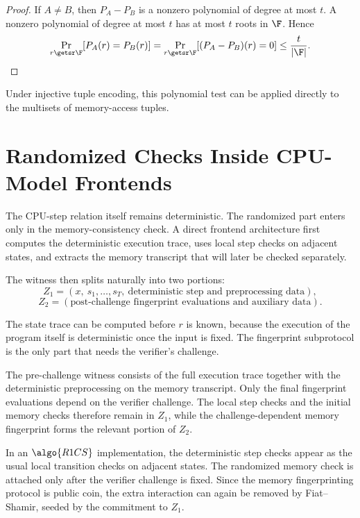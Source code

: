 \documentclass[11pt]{article}
\begin{document}
\begin{proof}
If $A \neq B$, then $P_A - P_B$ is a nonzero polynomial of degree at most $t$.
A nonzero polynomial of degree at most $t$ has at most $t$ roots in $\F$.
Hence
\[
  \Pr_{r \getsr \F}[P_A(r)=P_B(r)]
  =
  \Pr_{r \getsr \F}[(P_A-P_B)(r)=0]
  \le \frac{t}{|\F|}.
\]
\end{proof}

Under injective tuple encoding, this polynomial test can be applied directly to
the multisets of memory-access tuples.

\section{Randomized Checks Inside CPU-Model Frontends}

The CPU-step relation itself remains deterministic.  The randomized part enters
only in the memory-consistency check.  A direct frontend architecture first
computes the deterministic execution trace, uses local step checks on adjacent
states, and extracts the memory transcript that will later be checked
separately.

The witness then splits naturally into two portions:
\[
  Z_1 = (x,\ s_1,\ldots,s_T,\ \text{deterministic step and preprocessing data}),
\]
\[
  Z_2 = (\text{post-challenge fingerprint evaluations and auxiliary data}).
\]

The state trace can be computed before $r$ is known, because the execution of
the program itself is deterministic once the input is fixed.  The fingerprint
subprotocol is the only part that needs the verifier's challenge.

The pre-challenge witness consists of the full execution trace together with
the deterministic preprocessing on the memory transcript.  Only the final
fingerprint evaluations depend on the verifier challenge.  The local step
checks and the initial memory checks therefore remain in $Z_1$, while the
challenge-dependent memory fingerprint forms the relevant portion of $Z_2$.

In an $\algo{R1CS}$ implementation, the deterministic step checks appear as the
usual local transition checks on adjacent states.  The randomized memory check
is attached only after the verifier challenge is fixed.  Since the memory
fingerprinting protocol is public coin, the extra interaction can again be
removed by Fiat--Shamir, seeded by the commitment to $Z_1$.
\end{document}
